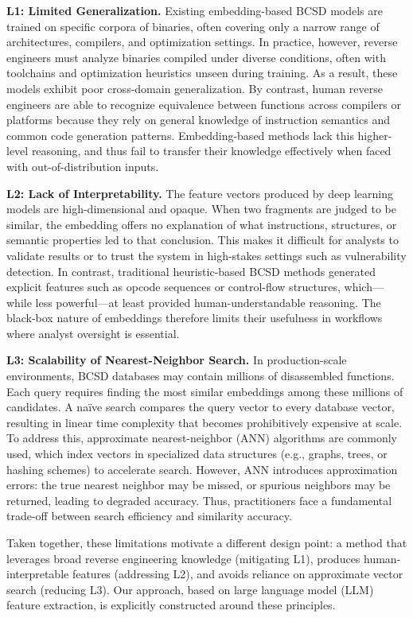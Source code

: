 \textbf{L1: Limited Generalization.}  
Existing embedding-based BCSD models are trained on specific corpora of binaries, often covering only a narrow range of architectures, compilers, and optimization settings. In practice, however, reverse engineers must analyze binaries compiled under diverse conditions, often with toolchains and optimization heuristics unseen during training. As a result, these models exhibit poor cross-domain generalization.  
By contrast, human reverse engineers are able to recognize equivalence between functions across compilers or platforms because they rely on general knowledge of instruction semantics and common code generation patterns. Embedding-based methods lack this higher-level reasoning, and thus fail to transfer their knowledge effectively when faced with out-of-distribution inputs.

\textbf{L2: Lack of Interpretability.}  
The feature vectors produced by deep learning models are high-dimensional and opaque. When two fragments are judged to be similar, the embedding offers no explanation of what instructions, structures, or semantic properties led to that conclusion. This makes it difficult for analysts to validate results or to trust the system in high-stakes settings such as vulnerability detection. In contrast, traditional heuristic-based BCSD methods generated explicit features such as opcode sequences or control-flow structures, which—while less powerful—at least provided human-understandable reasoning. The black-box nature of embeddings therefore limits their usefulness in workflows where analyst oversight is essential.

\textbf{L3: Scalability of Nearest-Neighbor Search.}  
In production-scale environments, BCSD databases may contain millions of disassembled functions. Each query requires finding the most similar embeddings among these millions of candidates. A naïve search compares the query vector to every database vector, resulting in linear time complexity that becomes prohibitively expensive at scale. To address this, approximate nearest-neighbor (ANN) algorithms are commonly used, which index vectors in specialized data structures (e.g., graphs, trees, or hashing schemes) to accelerate search. However, ANN introduces approximation errors: the true nearest neighbor may be missed, or spurious neighbors may be returned, leading to degraded accuracy. Thus, practitioners face a fundamental trade-off between search efficiency and similarity accuracy.

Taken together, these limitations motivate a different design point: a method that leverages broad reverse engineering knowledge (mitigating L1), produces human-interpretable features (addressing L2), and avoids reliance on approximate vector search (reducing L3). Our approach, based on large language model (LLM) feature extraction, is explicitly constructed around these principles.

